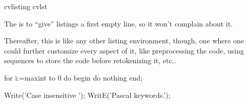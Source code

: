 \begin{codestore}[demoListings]
  { \lstset{language=Pascal} }
  {}

\cvRetokenEnvNewCommand
  {cvlisting} {cvlst}

   {} 
    { %
    }
    { %
    }
\end{codestore}


\begin{tsremark}
 The  is to ``give'' listings a first empty line, so it won't complain about it.
\end{tsremark}
 
 
Thereafter, this is like any other listing environment, though, one where one could further customize every aspect of it, like preprocessing the code, using sequences to store the code before retokenizing it, etc..

 \begin{codestore}[demoListings]
\begin{DemoListing}
 for i:=maxint to 0 do
 begin
 { do nothing }
 end;

 Write('Case insensitive ');
 WritE('Pascal keywords.');
\end{DemoListing}
 \end{codestore}



